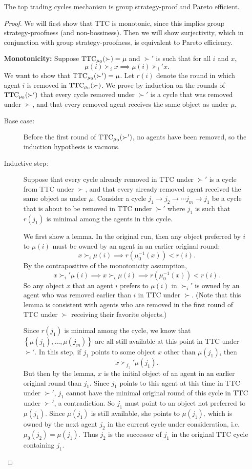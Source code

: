 \begin{proposition} \label{5-23-1}
	The top trading cycles mechanism is group strategy-proof and Pareto efficient.
\end{proposition}
\begin{proof}
	We will first show that TTC is monotonic, since this implies group strategy-proofness (and non-bossiness).
	Then we will show surjectivity, which in conjunction with group strategy-proofness, is equivalent to Pareto efficiency.

	\textbf{Monotonicity:} Suppose $\operatorname{TTC}_{\mu_0}(\succ) = \mu$ and $\succ'$ is such that for all $i$ and $x$, \[
		\mu(i) \succ_i x \implies \mu(i) \succ_i' x
	.\] 
	We want to show that $\operatorname{TTC}_{\mu_0}(\succ') = \mu$.
	Let $r(i)$ denote the round in which agent $i$ is removed in $\operatorname{TTC}_{\mu_0}(\succ)$.
	We prove by induction on the rounds of $\operatorname{TTC}_{\mu_0}(\succ')$ that every cycle removed under $\succ'$ is a cycle that was removed under $\succ$, and that every removed agent receives the same object as under $\mu$.
	\begin{description}
		\item[Base case:] Before the first round of $\operatorname{TTC}_{\mu_0}(\succ')$, no agents have been removed, so the induction hypothesis is vacuous.
		\item[Inductive step:] Suppose that every cycle already removed in TTC under $\succ'$ is a cycle from TTC under $\succ$, and that every already removed agent received the same object as under $\mu$.
			Consider a cycle $j_1 \to j_2 \to \cdots j_m \to j_1$ be a cycle that is about to be removed in TTC under $\succ'$ where $j_1$ is such that $r(j_1)$ is minimal among the agents in this cycle.

			We first show a lemma. In the original run, then any object preferred by $i$ to $\mu(i)$ must be owned by an agent in an earlier original round: \[
				x \succ_i \mu(i) \implies r(\mu_0^{-1}(x)) < r(i)
			.\] By the contrapositive of the monotonicity assumption, \[
				x \succ_i' \mu(i) \implies x\succ_i \mu(i) \implies r(\mu_0^{-1}(x)) < r(i)
			.\] So any object $x$ that an agent $i$ prefers to $\mu(i)$ in $\succ_i'$ is owned by an agent who was removed earlier than $i$ in TTC under $\succ$. (Note that this lemma is consistent with agents who are removed in the first round of TTC under $\succ$ receiving their favorite objects.)

			Since $r(j_1)$ is minimal among the cycle, we know that $\left\{\mu(j_1),\ldots,\mu(j_m)\right\}$ are all still available at this point in TTC under $\succ'$.
			In this step, if $j_1$ points to some object $x$ other than $\mu(j_1)$, then \[
				x \succ_{j_1}' \mu(j_1)
			.\] But then by the lemma, $x$ is the initial object of an agent in an earlier original round than $j_1$. Since $j_1$ points to this agent at this time in TTC under $\succ'$, $j_1$ cannot have the minimal original round of this cycle in TTC under $\succ'$, a contradiction.
			So $j_1$ must point to an object not preferred to $\mu(j_1)$. Since $\mu(j_1)$ is still available, she points to $\mu(j_1)$, which is owned by the next agent $j_2$ in the current cycle under consideration, i.e. $\mu_0(j_2) = \mu(j_1)$. Thus $j_2$ is the successor of $j_1$ in the original TTC cycle containing $j_1$. 
			

\end{description}
\end{proof}
